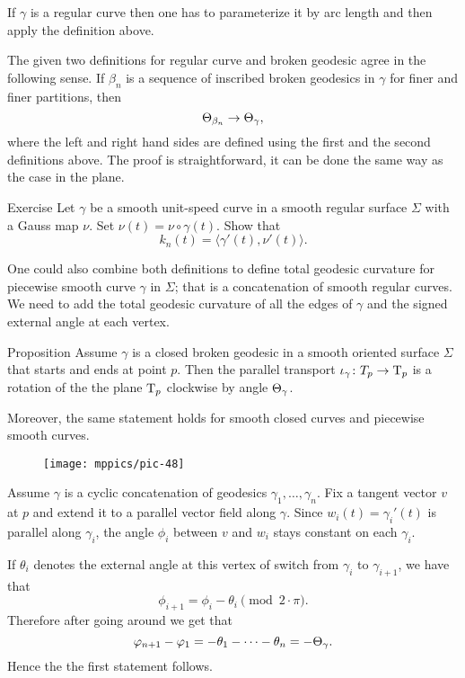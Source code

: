 If $\gamma$ is a regular curve then one has to parameterize it by arc length and then apply the definition above.

The given two definitions for regular curve and broken geodesic agree in the following sense.
If $\beta_n$ is a sequence of inscribed broken geodesics in $\gamma$ for finer and finer partitions, then 
\[\Theta_{\beta_n}\to\Theta_{\gamma},\]
where the left and right hand sides are defined using the first and the second definitions above.
The proof is straightforward, it can be done the same way as the case in the plane. %

\begin{thm}{Exercise}
Let $\gamma$ be a smooth unit-speed curve in a  smooth regular surface $\Sigma$ with a Gauss map $\nu$.
Set $\nu(t)=\nu\circ\gamma(t)$.
Show that 
\[k_n(t)=\langle\gamma'(t),\nu'(t)\rangle.\]

\end{thm}

One could also combine both definitions to define total geodesic curvature for 
piecewise smooth curve $\gamma$ in $\Sigma$; that is
a concatenation of smooth regular curves.
We need to add the total geodesic curvature of all the edges of $\gamma$ and the signed external angle at each vertex. 



\begin{thm}{Proposition}\label{prop:pt+tgc}
Assume $\gamma$ is a closed broken geodesic in a smooth oriented surface $\Sigma$ that starts and ends at point $p$.
Then the parallel transport $\iota_\gamma\colon T_p\to\mathrm{T}_p$ is a rotation of the the plane $\mathrm{T}_p$ clockwise by angle $\Theta_{\gamma}$.

Moreover, the same statement holds for smooth closed curves and piecewise smooth curves.
\end{thm}

\begin{wrapfigure}{o}{22 mm}
\vskip-0mm
\centering
\texttt{[image: mppics/pic-48]}
\vskip-0mm
\end{wrapfigure}

Assume $\gamma$ is a cyclic concatenation of geodesics $\gamma_1,\dots,\gamma_n$.
Fix a tangent vector $v$ at $p$ and extend it to a parallel vector field along $\gamma$.
Since $w_i(t)=\gamma_i'(t)$ is parallel along $\gamma_i$, the angle $\phi_i$ between $v$ and $w_i$ stays constant on each $\gamma_i$.

If $\theta_i$ denotes the external angle at this vertex of switch from $\gamma_{i}$ to $\gamma_{i+1}$, we have that 
\[\phi_{i+1}=\phi_i-\theta_i \pmod{2\cdot\pi}.\]
Therefore after going around we get that 
\[\varphi_{n+1}-\varphi_1=-\theta_1-\dots-\theta_n=-\Theta_{\gamma}.\]
Hence the the first statement follows.

